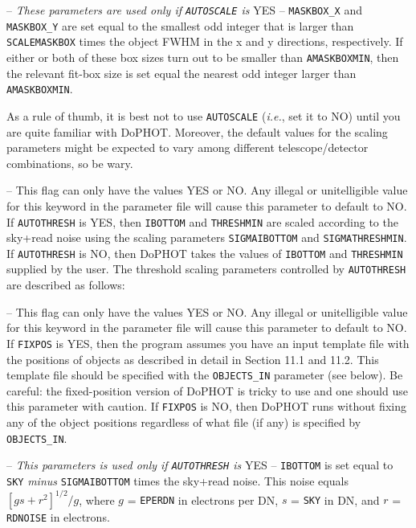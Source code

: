  -- 
{\it These parameters are used
only if {\tt AUTOSCALE} is} YES -- 
{\tt MASKBOX\_X} and 
{\tt MASKBOX\_Y} are set equal to the smallest odd integer
that is larger than 
{\tt SCALEMASKBOX} times the object FWHM in the x and y
directions, respectively.  If either or both of these 
box sizes turn out to be smaller than {\tt AMASKBOXMIN},
then the relevant fit-box size is set equal the nearest
odd integer larger than {\tt AMASKBOXMIN}.

\noindent As a rule of thumb, it is best not to use
{\tt AUTOSCALE} ({\it i.e.}, set it to NO) until you are quite 
familiar with DoPHOT.  Moreover, the default values for the
scaling parameters might be expected to vary among different
telescope/detector combinations, so be wary.

 -- This flag can only have the 
values YES or NO.  Any illegal or unitelligible
value for this keyword in the parameter file
will cause this parameter to default to NO.
If {\tt AUTOTHRESH} is YES, then {\tt IBOTTOM} and {\tt THRESHMIN}
are scaled according to the sky+read noise
using the scaling parameters {\tt SIGMAIBOTTOM} and 
{\tt SIGMATHRESHMIN}.  If {\tt AUTOTHRESH} is NO, then
DoPHOT takes the values of {\tt IBOTTOM} and 
{\tt THRESHMIN} supplied by the user.  The threshold scaling
parameters controlled by {\tt AUTOTHRESH} are described
as follows:

 -- This flag can only have the values
YES or NO.  Any illegal or unitelligible
value for this keyword in the parameter file
will cause this parameter to default to NO.
If {\tt FIXPOS} is YES, then the program assumes you have
an input template file with the positions of objects as
described in detail in Section 11.1 and 11.2.  This template
file should be specified with the {\tt OBJECTS\_IN} parameter
(see below).  Be careful:  the fixed-position version of
DoPHOT is tricky to use and one should use this parameter
with caution.  If {\tt FIXPOS} is NO, then DoPHOT runs without
fixing any of the object positions regardless of what file
(if any) is specified by {\tt OBJECTS\_IN}.

 -- 
{\it This parameters is used
only if {\tt AUTOTHRESH} is} YES -- 
{\tt IBOTTOM} is set equal to 
{\tt SKY} {\it minus} {\tt SIGMAIBOTTOM} times the sky+read
noise.  This  noise equals $[g s + r^2]^{1/2}/g$, where
$g$ = {\tt EPERDN} in electrons per DN, 
$s$ = {\tt SKY} in DN, and $r$ = {\tt RDNOISE} in
electrons.


